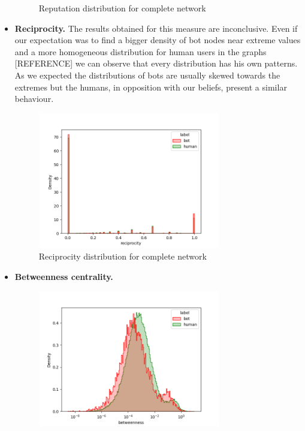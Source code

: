 \documentclass[12pt, a4paper]{article}
\begin{document}
\begin{itemize}
\begin{figure}[H]
                    \caption{Reputation distribution for complete network}
                \end{figure}
			\item \textbf{Reciprocity.} The results obtained for this measure are inconclusive. Even if our expectation was to find a bigger density of bot nodes near extreme values and a more homogeneous distribution for human users in the graphs [REFERENCE] we can observe that every distribution has his own patterns. As we expected the distributions of bots are usually skewed towards the extremes but the humans, in opposition with our beliefs, present a similar behaviour.
				\begin{figure}[H]
                	\centering
                    \includegraphics[width=0.75\textwidth]{complete_reciprocity.png}
                    \caption{Reciprocity distribution for complete network}
                \end{figure}
			\item \textbf{Betweenness centrality.}
                \begin{figure}[H]
                    \centering
                    \includegraphics[width=0.75\textwidth]{complete_betweenness.png}

\end{figure}
\end{itemize}
\end{document}
